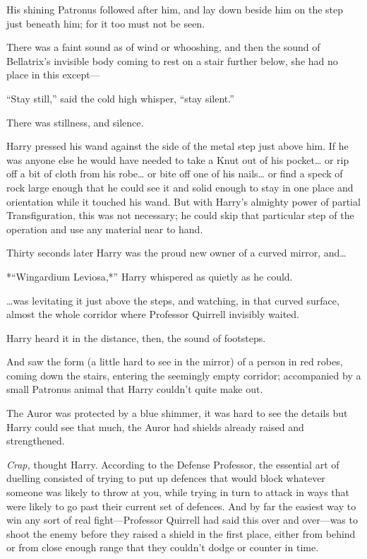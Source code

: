His shining Patronus followed after him, and lay down beside him on the
step just beneath him; for it too must not be seen.

There was a faint sound as of wind or whooshing, and then the sound of
Bellatrix's invisible body coming to rest on a stair further below, she
had no place in this except---

``Stay still,'' said the cold high whisper, ``stay silent.''

There was stillness, and silence.

Harry pressed his wand against the side of the metal step just above
him. If he was anyone else he would have needed to take a Knut out of
his pocket\ldots{} or rip off a bit of cloth from his robe\ldots{} or
bite off one of his nails\ldots{} or find a speck of rock large enough
that he could see it and solid enough to stay in one place and
orientation while it touched his wand. But with Harry's almighty power
of partial Transfiguration, this was not necessary; he could skip that
particular step of the operation and use any material near to hand.

Thirty seconds later Harry was the proud new owner of a curved mirror,
and\ldots{}

*``Wingardium Leviosa,*'' Harry whispered as quietly as he could.

\ldots{}was levitating it just above the steps, and watching, in that
curved surface, almost the whole corridor where Professor Quirrell
invisibly waited.

Harry heard it in the distance, then, the sound of footsteps.

And saw the form (a little hard to see in the mirror) of a person in red
robes, coming down the stairs, entering the seemingly empty corridor;
accompanied by a small Patronus animal that Harry couldn't quite make
out.

The Auror was protected by a blue shimmer, it was hard to see the
details but Harry could see that much, the Auror had shields already
raised and strengthened.

\emph{Crap,} thought Harry. According to the Defense Professor, the
essential art of duelling consisted of trying to put up defences that
would block whatever someone was likely to throw at you, while trying in
turn to attack in ways that were likely to go past their current set of
defences. And by far the easiest way to win any sort of real
fight---Professor Quirrell had said this over and over---was to shoot
the enemy before they raised a shield in the first place, either from
behind or from close enough range that they couldn't dodge or counter in
time.


